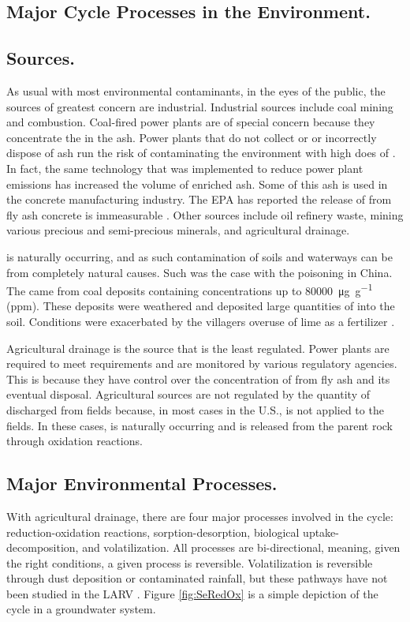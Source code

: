 \begin{linenumbers}[1]
\section{Major \Se Cycle Processes in the Environment.}
\label{sec:major processes}

\subsection*{\Se Sources.}
As usual with most environmental contaminants, in the eyes of the public, the sources of greatest concern are industrial.  Industrial sources include coal mining and combustion.  Coal-fired power plants are of special concern because they concentrate the \Se in the ash.  Power plants that do not collect or or incorrectly dispose of ash run the risk of contaminating the environment with high does of \Se \parencite{Lemly2002}.  In fact, the same technology that was implemented to reduce power plant emissions has increased the volume of \Se enriched ash.  Some of this ash is used in the concrete manufacturing industry.  The EPA has reported the release of \Se from fly ash concrete is immeasurable \parencite{EPA2014}.  Other sources include oil refinery waste, mining various precious and semi-precious minerals, and agricultural drainage.

\Se is naturally occurring, and as such contamination of soils and waterways can be from completely natural causes.  Such was the case with the \Se poisoning in China.  The \Se came from coal deposits containing \Se concentrations up to \SI{80000}{\micro\g\per\g} (ppm).  These deposits were weathered and deposited large quantities of \Se into the soil.   Conditions were exacerbated by the villagers overuse of lime as a fertilizer \parencite{yang1983}.

Agricultural drainage is the \Se source that is the least regulated.  Power plants are required to meet requirements and are monitored by various regulatory agencies.  This is because they have control over the concentration of \Se from fly ash and its eventual disposal.  Agricultural sources are not regulated by the quantity of \Se discharged from fields because, in most cases in the U.S., \Se is not applied to the fields.  In these cases, \Se is naturally occurring and is released from the parent rock through oxidation reactions.  

\subsection*{Major Environmental Processes.}
With agricultural drainage, there are four major processes involved in the \Se cycle: reduction-oxidation reactions, sorption-desorption, biological uptake-decomposition, and volatilization.  All processes are bi-directional, meaning, given the right conditions, a given process is reversible.  Volatilization is reversible through \Se dust deposition or \Se contaminated rainfall, but these pathways have not been studied in the LARV \parencite{Lawson2001}.  Figure \ref{fig:SeRedOx} is a simple depiction of the \Se cycle in a groundwater system.


\end{linenumbers}
